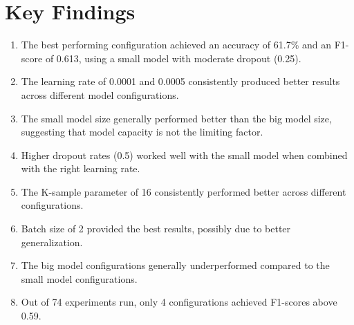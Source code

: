 \documentclass{article}
\begin{document}
\section{Key Findings}
\begin{enumerate}
    \item The best performing configuration achieved an accuracy of 61.7\% and an F1-score of 0.613, using a small model with moderate dropout (0.25).
    \item The learning rate of 0.0001 and 0.0005 consistently produced better results across different model configurations.
    \item The small model size generally performed better than the big model size, suggesting that model capacity is not the limiting factor.
    \item Higher dropout rates (0.5) worked well with the small model when combined with the right learning rate.
    \item The K-sample parameter of 16 consistently performed better across different configurations.
    \item Batch size of 2 provided the best results, possibly due to better generalization.
    \item The big model configurations generally underperformed compared to the small model configurations.
    \item Out of 74 experiments run, only 4 configurations achieved F1-scores above 0.59.
\end{enumerate}
\end{document}

